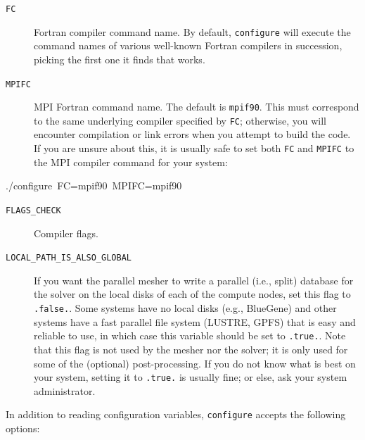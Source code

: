 \documentclass[oneside,english]{book}
\newenvironment{lyxcode}
{\begin{list}{}{
\setlength{\rightmargin}{\leftmargin}
\setlength{\listparindent}{0pt}%
\raggedright
\setlength{\itemsep}{0pt}
\setlength{\parsep}{0pt}
\normalfont\ttfamily}%
 \item[]}
{\end{list}}
\begin{document}
\begin{description}
\item [{\texttt{FC}}] Fortran compiler command name. By default, \texttt{configure}
will execute the command names of various well-known Fortran compilers
in succession, picking the first one it finds that works.
\item [{\texttt{MPIFC}}] MPI Fortran command name. The default is \texttt{mpif90}.
This must correspond to the same underlying compiler specified by
\texttt{FC}; otherwise, you will encounter compilation or link errors
when you attempt to build the code. If you are unsure about this,
it is usually safe to set both \texttt{FC} and \texttt{MPIFC} to the
MPI compiler command for your system:
\end{description}
\begin{lyxcode}
./configure~FC=mpif90~MPIFC=mpif90
\end{lyxcode}
\begin{description}
\item [{\texttt{FLAGS\_CHECK}}] Compiler flags.
\item [{\texttt{LOCAL\_PATH\_IS\_ALSO\_GLOBAL}}]
If you want the parallel mesher to write a parallel (i.e., split) database for the solver on the
local disks of each of the compute nodes, set this flag to \texttt{.false.}.
Some systems have no local disks
(e.g., BlueGene) and other systems have a fast
parallel file system (LUSTRE, GPFS) that is easy and reliable to use, in which case this variable should be set to
\texttt{.true.}. Note that this flag is not used by the mesher nor
the solver; it is only used for some of the (optional) post-processing.
If you do not know what is best on your system, setting it to \texttt{.true.} is usually fine; or else, ask your system administrator.
\end{description}
In addition to reading configuration variables, \texttt{configure}
accepts the following options:
\end{document}
